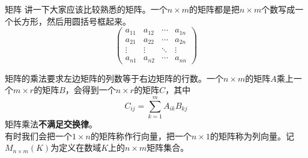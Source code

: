 \documentclass{beamer}
\begin{document}
\begin{frame}{矩阵}
	讲一下大家应该比较熟悉的矩阵。一个$n \times m$的矩阵都是把$n \times m$个数写成一个长方形，然后用圆括号框起来。$$\begin{pmatrix}
		a_{11} & a_{12} & \cdots & a_{1n}\\
		a_{21} & a_{22} & \cdots & a_{2n}\\
		\vdots & \vdots & \ddots & \vdots\\
		a_{n1} & a_{n2} & \cdots & a_{nn}
		\end{pmatrix}$$
	
	矩阵的乘法要求左边矩阵的列数等于右边矩阵的行数。一个$n \times m$的矩阵$A$乘上一个$m \times r$的矩阵$B$，会得到一个$n \times r$的矩阵$C$，其中$$C_{ij} = \sum_{k=1}^mA_{ik}B_{kj}$$矩阵乘法\textbf{不满足交换律}。\\
	
	有时我们会把一个$1 \times n$的矩阵称作行向量，把一个$n \times 1$的矩阵称为列向量。记$M_{n \times m}(K)$为定义在数域$K$上的$n \times m$矩阵集合。
\end{frame}
\end{document}
